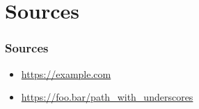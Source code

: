 \section{Sources}
\begin{frame}
    \transwipe
    \frametitle{Sources}

    \begin{itemize}
        \item \url{https://example.com}
        \item \url{https://foo.bar/path_with_underscores}
    \end{itemize}
\end{frame}

